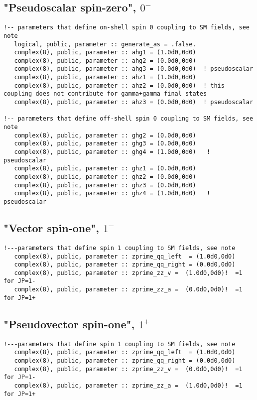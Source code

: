 \documentclass[aps,superscriptaddress,nofootinbib]{revtex4}
\begin{document}
\subsection{"Pseudoscalar spin-zero", $0^-$}

\footnotesize
\begin{verbatim}
!-- parameters that define on-shell spin 0 coupling to SM fields, see note
   logical, public, parameter :: generate_as = .false.
   complex(8), public, parameter :: ahg1 = (1.0d0,0d0)
   complex(8), public, parameter :: ahg2 = (0.0d0,0d0)
   complex(8), public, parameter :: ahg3 = (0.0d0,0d0)  ! pseudoscalar
   complex(8), public, parameter :: ahz1 = (1.0d0,0d0)
   complex(8), public, parameter :: ahz2 = (0.0d0,0d0)  ! this coupling does not contribute for gamma+gamma final states
   complex(8), public, parameter :: ahz3 = (0.0d0,0d0)  ! pseudoscalar

!-- parameters that define off-shell spin 0 coupling to SM fields, see note
   complex(8), public, parameter :: ghg2 = (0.0d0,0d0)
   complex(8), public, parameter :: ghg3 = (0.0d0,0d0)
   complex(8), public, parameter :: ghg4 = (1.0d0,0d0)   ! pseudoscalar
   complex(8), public, parameter :: ghz1 = (0.0d0,0d0)
   complex(8), public, parameter :: ghz2 = (0.0d0,0d0)
   complex(8), public, parameter :: ghz3 = (0.0d0,0d0)
   complex(8), public, parameter :: ghz4 = (1.0d0,0d0)   ! pseudoscalar
\end{verbatim}
\normalsize

\subsection{"Vector spin-one", $1^-$}

\footnotesize
\begin{verbatim}
!---parameters that define spin 1 coupling to SM fields, see note
   complex(8), public, parameter :: zprime_qq_left  = (1.0d0,0d0)
   complex(8), public, parameter :: zprime_qq_right = (0.0d0,0d0)
   complex(8), public, parameter :: zprime_zz_v =  (1.0d0,0d0)!  =1 for JP=1-
   complex(8), public, parameter :: zprime_zz_a =  (0.0d0,0d0)!  =1 for JP=1+
\end{verbatim}
\normalsize

\subsection{"Pseudovector spin-one", $1^+$}

\footnotesize
\begin{verbatim}
!---parameters that define spin 1 coupling to SM fields, see note
   complex(8), public, parameter :: zprime_qq_left  = (1.0d0,0d0)
   complex(8), public, parameter :: zprime_qq_right = (0.0d0,0d0)
   complex(8), public, parameter :: zprime_zz_v =  (0.0d0,0d0)!  =1 for JP=1-
   complex(8), public, parameter :: zprime_zz_a =  (1.0d0,0d0)!  =1 for JP=1+
\end{verbatim}
\normalsize
\end{document}

